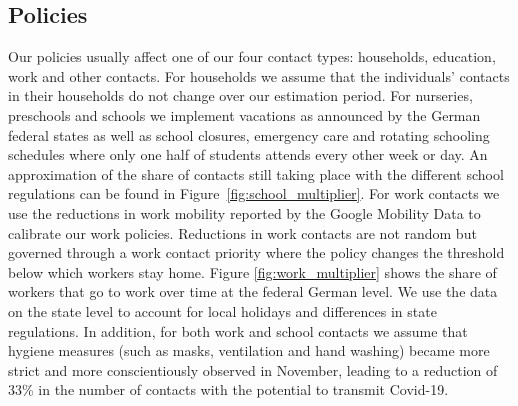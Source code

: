 \subsection{Policies}
\label{subsec:policies}

Our policies usually affect one of our four contact types: households, education, work
and other contacts.
For households we assume that the individuals' contacts in their households do not change
over our estimation period.
For nurseries, preschools and schools we implement vacations as announced by the German
federal states as well as school closures, emergency care and rotating schooling
schedules where only one half of students attends every other week or day.%
An approximation of the share of contacts still taking place with the different school
regulations can be found in Figure~\ref{fig:school_multiplier}.
For work contacts we use the reductions in work mobility reported by the Google Mobility
Data \citep{Google2021} to calibrate our work policies. Reductions in work contacts are
not random but governed through a work contact priority where the policy changes the
threshold below which workers stay home. Figure \ref{fig:work_multiplier} shows the share
of workers that go to work over time at the federal German level. We use the data on the
state level to account for local holidays and differences in state regulations.
In addition, for both work and school contacts we assume that hygiene measures (such as
masks, ventilation and hand washing) became more strict and more conscientiously observed
in November, leading to a reduction of 33\% in the number of contacts with the potential
to transmit Covid-19.


